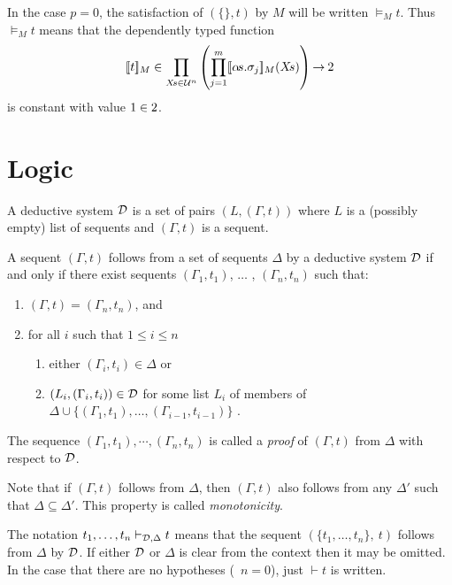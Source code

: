 In the case $p=0$, the satisfaction of $(\{\},t)$ by $M$ will be written
$\models_{M} t$. Thus $\models_{M} t$ means that the dependently typed function
\[
[\![t]\!]_M \in \prod_{X\!s\in{\cal U}^{n}}
\left(\prod_{j=1}^{m}[\![\alpha\!s.\sigma_{j}]\!]_M(X\!s)\right) {\to} \:\mbox{\rm 2}
\]
is constant with value $1\in\mbox{\rm 2}$.

\section{Logic}

A deductive system
${\cal D}$ is a set of pairs $(L,(\Gamma,t))$ where $L$ is a
(possibly empty) list of sequents and $(\Gamma,t)$ is a sequent.

A sequent $(\Gamma,t)$ follows from
a set of sequents
$\Delta$ by a deductive system
${\cal D}$ if
and only if there exist sequents
$(\Gamma_1,t_1)$, $\ldots$ , $(\Gamma_n,t_n)$ such that:
\begin{enumerate}
\item $(\Gamma,t) = (\Gamma_n,t_n)$, and
\item for all $i$ such that $1\leq i\leq n$
\begin{enumerate}
\item either
$(\Gamma_i,t_i)\in \Delta$ or
\item $(L_i,(\Gamma_i,t_i))\in{\cal D}$ for some list $L_i$ of members of
$\Delta\cup\{(\Gamma_1,t_1),\ldots,(\Gamma_{i-1},t_{i-1})\}$ .
\end{enumerate}
\end{enumerate}
The sequence $(\Gamma_1,t_1),\cdots,(\Gamma_n,t_n)$
is called a {\it proof\/} of
$(\Gamma,t)$ from $\Delta$ with respect to ${\cal D}$.

Note that if $(\Gamma,t)$ follows from $\Delta$, then $(\Gamma,t)$
also follows from any $\Delta'$ such that $\Delta\subseteq\Delta'$.
This property is called {\it monotonicity\/}.

The notation $t_1,\ldots,t_n\vdash_{{\cal
D},\Delta} t$ means that the sequent $(\{t_1,\ldots,t_n\},\ t)$
follows from $\Delta$ by ${\cal D}$.  If either ${\cal D}$ or $\Delta$
is clear from the context then it may be omitted.  In the case that
there are no hypotheses (\ie\ $n=0$),
just $\vdash t$ is written.

